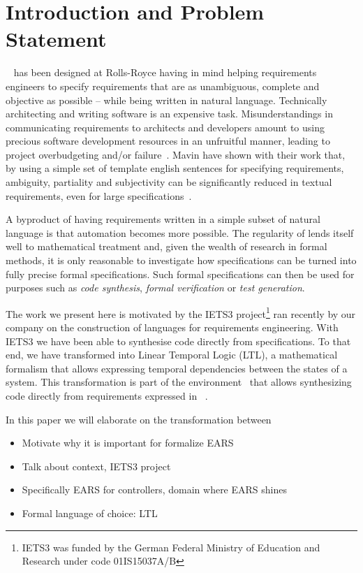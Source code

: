 \section{Introduction and Problem Statement}

\ears~\cite{EARS09} has been designed at Rolls-Royce having in mind helping
requirements engineers to specify requirements that are as unambiguous, complete
and objective as possible -- while being written in natural language.
Technically architecting and writing software is an expensive task.
Misunderstandings in communicating requirements to architects and developers
amount to using precious software development resources in an unfruitful manner,
leading to project overbudgeting and/or failure~\cite{chaos:2014}. Mavin \etal
have shown with their work that, by using a simple set of template english
sentences for specifying requirements, ambiguity, partiality and subjectivity
can be significantly reduced in textual requirements, even for large
specifications~\cite{EARS10,EARS16}.

A byproduct of having requirements written in a simple subset of natural
language is that automation becomes more possible. The regularity of \ears lends
itself well to mathematical treatment and, given the wealth of research in
formal methods, it is only reasonable to investigate how \ears specifications
can be turned into fully precise formal specifications. Such formal
specifications can then be used for purposes such as \emph{code synthesis},
\emph{formal verification} or \emph{test generation}.

The work we present here is motivated by the IETS3 project\footnote{IETS3 was
funded by the German Federal Ministry of Education and Research under code
01IS15037A/B} ran recently by our company on the construction of languages for
requirements engineering. With IETS3 we have been able to synthesise code
directly from \ears specifications. To that end, we have transformed \ears into
Linear Temporal Logic (LTL), a mathematical formalism that allows expressing
temporal dependencies between the states of a system. This transformation is
part of the \earsctrl environment~\cite{earsctrlProcess} that allows
synthesizing code directly from requirements expressed in
\ears~\cite{LucioRCA16,LucioRAM17}.

In this paper we will elaborate on the transformation between \ears 

\begin{itemize} 
  \item Motivate why it is important for formalize EARS
  \item Talk about context, IETS3 project
  \item Specifically EARS for controllers, domain where EARS shines 
  \item Formal language of choice: LTL
\end{itemize}